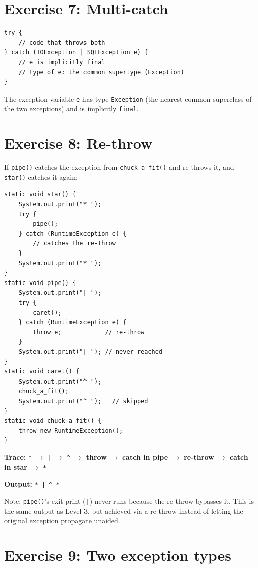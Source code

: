 \documentclass[twoside=false,DIV=14]{scrartcl}
\begin{document}
\section*{Exercise 7: Multi-catch}

\begin{lstlisting}
try {
    // code that throws both
} catch (IOException | SQLException e) {
    // e is implicitly final
    // type of e: the common supertype (Exception)
}
\end{lstlisting}

The exception variable \texttt{e} has type \texttt{Exception} (the nearest common superclass of the two exceptions) and is implicitly \texttt{final}.


\section*{Exercise 8: Re-throw}

If \texttt{pipe()} catches the exception from \texttt{chuck\_a\_fit()} and re-throws it, and \texttt{star()} catches it again:

\begin{lstlisting}
static void star() {
    System.out.print("* ");
    try {
        pipe();
    } catch (RuntimeException e) {
        // catches the re-throw
    }
    System.out.print("* ");
}
static void pipe() {
    System.out.print("| ");
    try {
        caret();
    } catch (RuntimeException e) {
        throw e;            // re-throw
    }
    System.out.print("| "); // never reached
}
static void caret() {
    System.out.print("^ ");
    chuck_a_fit();
    System.out.print("^ ");   // skipped
}
static void chuck_a_fit() {
    throw new RuntimeException();
}
\end{lstlisting}

\textbf{Trace:} \texttt{*} $\rightarrow$ \texttt{|} $\rightarrow$ \texttt{\^{}} $\rightarrow$ \textbf{throw} $\rightarrow$ \textbf{catch in pipe} $\rightarrow$ \textbf{re-throw} $\rightarrow$ \textbf{catch in star} $\rightarrow$ \texttt{*}

\textbf{Output:} \texttt{* | \^{} *}

Note: \texttt{pipe()}'s exit print (\texttt{|}) never runs because the re-throw bypasses it.  This is the same output as Level 3, but achieved via a re-throw instead of letting the original exception propagate unaided.

\section*{Exercise 9: Two exception types}
\end{document}
